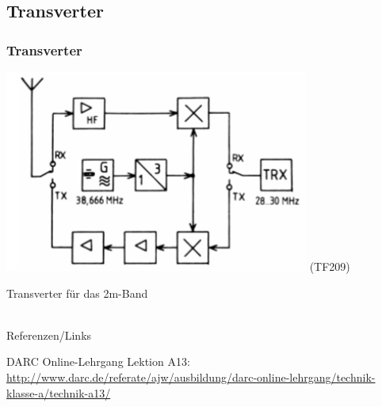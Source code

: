 \subsection{Transverter}

\begin{frame}
    \frametitle{Transverter}

    \begin{center}
        \includegraphics[width=0.75\textwidth]{a13/TF209.png}
        \tiny (TF209)
    \end{center}

    Transverter für das 2m-Band

\end{frame}

\renewcommand{\refname}{Referenzen}

\hypertarget{refs}{}
\textcolor{white}{} \\ %
\Large Referenzen/Links
\footnotesize

\begin{thebibliography}{}
      DARC Online-Lehrgang Lektion A13:
                    \url{http://www.darc.de/referate/ajw/ausbildung/darc-online-lehrgang/technik-klasse-a/technik-a13/}
\end{thebibliography} 


